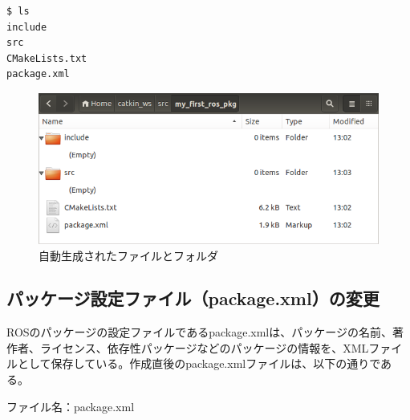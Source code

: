\begin{lstlisting}[language=ROS]
$ ls
include
src
CMakeLists.txt
package.xml
\end{lstlisting}

\begin{figure}[h]
  \centering
  \includegraphics[width=12cm]{pictures/chapter3/pic_03_17.png}
  \caption{自動生成されたファイルとフォルダ}
\end{figure}

 \subsection{パッケージ設定ファイル（package.xml）の変更}
ROSのパッケージの設定ファイルであるpackage.xmlは、パッケージの名前、著作者、ライセンス、依存性パッケージなどのパッケージの情報を、XMLファイルとして保存している。作成直後のpackage.xmlファイルは、以下の通りである。

ファイル名：package.xml


